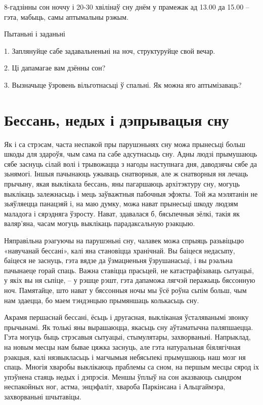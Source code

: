 8-гадзінны сон ноччу і 20-30 хвілінаў сну днём у прамежак ад 13.00 да 15.00 – гэта, мабыць, самы аптымальны рэжым.

Пытаньні і заданьні

1. Заплянуйце сабе задавальненьні на ноч, структуруйце свой вечар.

2. Ці дапамагае вам дзённы сон?

3. Вызначыце ўзровень вільготнасьці ў спальні. Як можна яго аптымізаваць?


\section{Бессань, недых і дэпрывацыя сну}

Як і са стрэсам, часта неспакой пры парушэньнях сну можа прынесьці больш шкоды для здароўя, чым сама па сабе адсутнасьць сну. Адны людзі прымушаюць сябе заснуць сілай волі і трывожацца з нагоды наступнага дня, даводзячы сябе да зьнямогі. Іншыя пачынаюць ужываць снатворныя, але ж снатворныя ня лечаць прычыну, якая выклікала бессань, яны пагаршаюць архітэктуру сну, могуць выклікаць залежнасьць і мець заўважтныя пабочныя эфэкты. Той жа мэлятанін не зьяўляецца панацэяй і, на маю думку, можа нават прынесьці шкоду людзям маладога і сярэдняга ўзросту. Нават, здавалася б, бясьпечныя зёлкі, такія як валяр'яна, часам могуць выклікаць парадаксальную рэакцыю.

Няправільна рэагуючы на парушэньні сну, чалавек можа спрыяць разьвіцьцю «навучанай бессані», калі яна становіцца хранічнай. Вы баіцеся недасыпу, баіцеся не заснуць, гэта вядзе да ўзмацненьня ўзрушанасьці, і вы рэальна пачынаеце горай спаць. Важна ставіцца прасьцей, не катастрафізаваць сытуацыі, у якіх вы ня сьпіце, – у рэшце рэшт, гэта дапаможа лягчэй перажыць бяссонную ноч. Памятайце, што нават у бяссонныя ночы мы ўсё роўна сьпім больш, чым нам здаецца, бо маем тэндэнцыю прымяншаць колькасьць сну.

Акрамя першаснай бессані, ёсьць і другасная, выкліканая ўсталяванымі звонку прычынамі. Як толькі яны вырашаюцца, якасьць сну аўтаматычна паляпшаецца. Гэта могуць быць стрэсавыя сытуацыі, стымулятары, захворваньні. Напрыклад, на новым месцы нам бывае цяжка заснуць, але гэта натуральная біялягічная рэакцыя, калі нязвыкласьць і магчымыя небясьпекі прымушаюць наш мозг ня спаць. Многія хваробы выклікаюць праблемы са сном, на першым месцы сярод іх упэўнена стаяць недых і дэпрэсія. Меншы ўплыў на сон аказваюць сындром неспакойных ног, астма, энцэфаліт, хвароба Паркінсана і Альцгаймэра, захворваньні шчытавіцы. 

